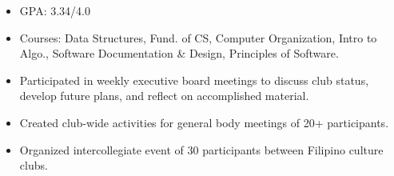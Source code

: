 






\begin{itemize}
\item GPA: 3.34/4.0
\item Courses: Data Structures, Fund. of CS, Computer Organization, Intro to Algo., Software Documentation \& Design, Principles of Software.
\end{itemize}

\begin{itemize}
\item Participated in weekly executive board meetings to discuss club status, develop future plans, and reflect on accomplished material.
\item Created club-wide activities for general body meetings of 20+ participants.
\item Organized intercollegiate event of 30 participants between Filipino culture clubs.
\end{itemize}


